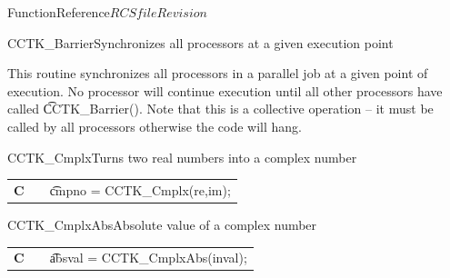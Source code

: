\begin{cactuspart}{FunctionReference}{$RCSfile$}{$Revision$}

\begin{CCTKFunc}{CCTK\_Barrier}{Synchronizes all processors at a given execution point}
\label{CCTK-Barrier}
\showargs
\begin{params}
\end{params}
\begin{discussion}
\end{discussion}
This routine synchronizes all processors in a parallel job at a given point of
execution. No processor will continue execution until all other processors
have called {\t CCTK\_Barrier()}. Note that this is a collective operation --
it must be called by all processors otherwise the code will hang.
\end{CCTKFunc}



\begin{CCTKFunc}{CCTK\_Cmplx}{Turns two real numbers into a complex number}
\label{CCTK-Cmplx}
\showcargs
\begin{params}
\end{params}
\begin{discussion}
\end{discussion}
\begin{examples}
\begin{tabular}{@{}p{3cm}cp{11cm}}
\hfill {\bf C} && {\t cmpno = CCTK\_Cmplx(re,im)};
\end{tabular}
\end{examples}
\begin{errorcodes}
\end{errorcodes}
\end{CCTKFunc}


\begin{CCTKFunc}{CCTK\_CmplxAbs}{Absolute value of a complex number}
\label{CCTK-CmplxAbs}
\showcargs
\begin{params}
\end{params}
\begin{discussion}
\end{discussion}
\begin{examples}
\begin{tabular}{@{}p{3cm}cp{11cm}}
\hfill {\bf C} && {\t absval = CCTK\_CmplxAbs(inval)};
\end{tabular}
\end{examples}
\begin{errorcodes}
\end{errorcodes}
\end{CCTKFunc}



\end{cactuspart}
